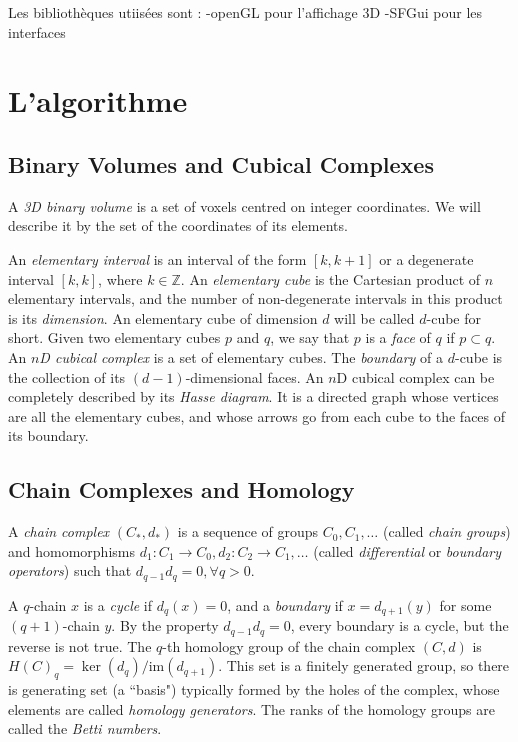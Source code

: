\documentclass[10pt,a4paper]{report}
\begin{document}
Les bibliothèques utiisées sont : 
	-openGL pour l'affichage 3D
	-SFGui pour les interfaces


\chapter{L'algorithme}

\section{Binary Volumes and Cubical Complexes}
A \emph{3D binary volume} is a set of voxels centred on integer coordinates. We will describe it by the set of the coordinates of its elements.

An \emph{elementary interval} is an interval of the form $\left[ k, k+1\right]$ or a degenerate interval $\left[ k, k \right]$, where $k \in \mathbb{Z}$. An \emph{elementary cube} is the Cartesian product of $n$ elementary intervals, and the number of non-degenerate intervals in this product is its \emph{dimension}. An elementary cube of dimension $d$ will be called $d$-cube for short. Given two elementary cubes $p$ and $q$, we say that $p$ is a \emph{face} of $q$ if $p \subset q$.
An \emph{$n$D cubical complex} is a set of elementary cubes. The \emph{boundary} of a $d$-cube is the collection of its $(d-1)$-dimensional faces. 
An $n$D cubical complex can be completely described by its \emph{Hasse diagram}. It is a directed graph whose vertices are all the elementary cubes, and whose arrows go from each cube to the faces of its boundary.


\section{Chain Complexes and Homology}
A \emph{chain complex} $(C_*, d_*)$ is a sequence of groups $C_0, C_1, \ldots$ (called \emph{chain groups}) and homomorphisms $d_1 : C_1 \rightarrow C_0, d_2 : C_2 \rightarrow C_1, \ldots$ (called \emph{differential} or \emph{boundary operators}) such that $d_{q-1} d_q = 0,  \forall q > 0$.

A $q$-chain $x$ is a \emph{cycle} if $d_q(x) = 0$, and a \emph{boundary} if $x = d_{q+1}(y)$ for some $(q+1)$-chain $y$. By the property $d_{q-1} d_q = 0$, every boundary is a cycle, but the reverse is not true. The $q$-th homology group of the chain complex $(C, d)$ is $H(C)_q = \ker(d_q) / \mathrm{im}(d_{q+1})$. This set is a finitely generated group, so there is generating set (a ``basis") typically formed by the holes of the complex, whose elements are called \emph{homology generators}. The ranks of the homology groups are called the \emph{Betti numbers}.
\end{document}

